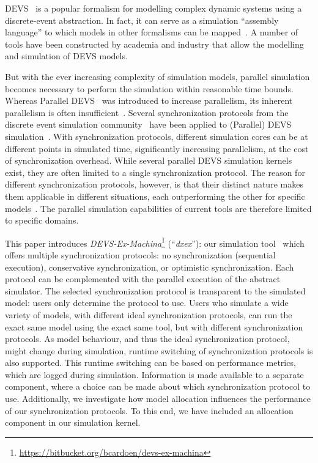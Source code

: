 \textsf{DEVS}~\cite{ClassicDEVS} is a popular formalism for modelling complex dynamic systems using a discrete-event abstraction.
In fact, it can serve as a simulation ``assembly language'' to which models in other formalisms can be mapped~\cite{DEVSbase}.
A number of tools have been constructed by academia and industry that allow the modelling and simulation of \textsf{DEVS} models.

But with the ever increasing complexity of simulation models, parallel simulation becomes necessary to perform the simulation within reasonable time bounds.
Whereas \textsf{Parallel DEVS}~\cite{ParallelDEVS} was introduced to increase parallelism, its inherent parallelism is often insufficient~\cite{Himmelspach}.
Several synchronization protocols from the discrete event simulation community~\cite{FujimotoBook} have been applied to (\textsf{Parallel}) \textsf{DEVS} simulation~\cite{globaltimewarp}.
With synchronization protocols, different simulation cores can be at different points in simulated time, significantly increasing parallelism, at the cost of synchronization overhead.
While several parallel \textsf{DEVS} simulation kernels exist, they are often limited to a single synchronization protocol.
The reason for different synchronization protocols, however, is that their distinct nature makes them applicable in different situations, each outperforming the other for specific models~\cite{Jafer}.
The parallel simulation capabilities of current tools are therefore limited to specific domains.

This paper introduces \textit{DEVS-Ex-Machina}\footnote{\url{https://bitbucket.org/bcardoen/devs-ex-machina}} (``\textit{dxex}''): our simulation tool~\cite{dxex} which offers multiple synchronization protocols: no synchronization (sequential execution), conservative synchronization, or optimistic synchronization. Each protocol can be complemented with the parallel execution of the abstract simulator.
The selected synchronization protocol is transparent to the simulated model: users only determine the protocol to use.
Users who simulate a wide variety of models, with different ideal synchronization protocols, can run the exact same model using the exact same tool, but with different synchronization protocols.
As model behaviour, and thus the ideal synchronization protocol, might change during simulation, runtime switching of synchronization protocols is also supported.
This runtime switching can be based on performance metrics, which are logged during simulation.
Information is made available to a separate component, where a choice can be made about which synchronization protocol to use. %
Additionally, we investigate how model allocation influences the performance of our synchronization protocols.
To this end, we have included an allocation component in our simulation kernel.

